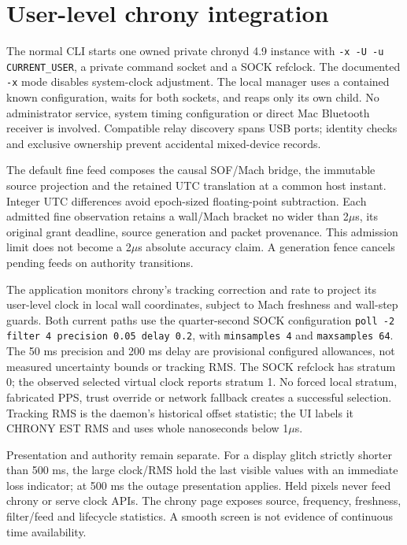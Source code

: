 \documentclass[11pt,letterpaper]{article}
\newcommand{\code}[1]{\texttt{#1}}\newcolumntype{L}[1]{>{\RaggedRight\arraybackslash}p{#1}}
\begin{document}
\section{User-level chrony integration}
The normal CLI starts one owned private chronyd 4.9 instance with \code{-x -U -u CURRENT\_USER}, a private command socket and a SOCK refclock. The documented \code{-x} mode disables system-clock adjustment\cite{chrony}. The local manager uses a contained known configuration, waits for both sockets, and reaps only its own child. No administrator service, system timing configuration or direct Mac Bluetooth receiver is involved. Compatible relay discovery spans USB ports; identity checks and exclusive ownership prevent accidental mixed-device records.

The default fine feed composes the causal SOF/Mach bridge, the immutable source projection and the retained UTC translation at a common host instant. Integer UTC differences avoid epoch-sized floating-point subtraction. Each admitted fine observation retains a wall/Mach bracket no wider than 2$\mu$s, its original grant deadline, source generation and packet provenance. This admission limit does not become a 2$\mu$s absolute accuracy claim. A generation fence cancels pending feeds on authority transitions.

The application monitors chrony's tracking correction and rate to project its user-level clock in local wall coordinates, subject to Mach freshness and wall-step guards. Both current paths use the quarter-second SOCK configuration \code{poll -2 filter 4 precision 0.05 delay 0.2}, with \code{minsamples 4} and \code{maxsamples 64}. The 50 ms precision and 200 ms delay are provisional configured allowances, not measured uncertainty bounds or tracking RMS. The SOCK refclock has stratum 0; the observed selected virtual clock reports stratum 1. No forced local stratum, fabricated PPS, trust override or network fallback creates a successful selection. Tracking RMS is the daemon's historical offset statistic\cite{chrony}; the UI labels it CHRONY EST RMS and uses whole nanoseconds below 1$\mu$s.

Presentation and authority remain separate. For a display glitch strictly shorter than 500 ms, the large clock/RMS hold the last visible values with an immediate loss indicator; at 500 ms the outage presentation applies. Held pixels never feed chrony or serve clock APIs. The chrony page exposes source, frequency, freshness, filter/feed and lifecycle statistics. A smooth screen is not evidence of continuous time availability.
\end{document}
